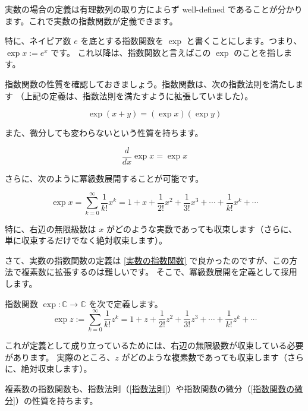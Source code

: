\documentclass[a5paper]{ltjsarticle}
\begin{document}
実数の場合の定義は有理数列の取り方によらず well-defined であることが分かります。これで実数の指数関数が定義できます。

特に、ネイピア数 \(e\) を底とする指数関数を \(\exp \) と書くことにします。つまり、\(\exp x := e^x\) です。
これ以降は、指数関数と言えばこの \(\exp \) のことを指します。

指数関数の性質を確認しておきましょう。指数関数は、次の指数法則を満たします
（上記の定義は、指数法則を満たすように拡張していました）。

\begin{usmproposition}[指数法則]\label{指数法則}
    \[
        \exp(x + y) = (\exp x) (\exp y)
    \]
\end{usmproposition}

また、微分しても変わらないという性質を持ちます。

\begin{usmproposition}[指数関数の微分]\label{指数関数の微分}
    \[
        \frac{d}{dx} \exp x = \exp x
    \]
\end{usmproposition}

さらに、次のように冪級数展開することが可能です。

\begin{usmproposition}[指数関数の冪級数展開]
    \[
        \exp x = \sum_{k=0}^{\infty} \frac{1}{k!} x^k
        = 1 + x + \frac{1}{2!}x^2 + \frac{1}{3!}x^3 + \cdots + \frac{1}{k!}x^k + \cdots
    \]
\end{usmproposition}

特に、右辺の無限級数は \(x\) がどのような実数であっても収束します（さらに、単に収束するだけでなく絶対収束します）。

さて、実数の指数関数の定義は \autoref{実数の指数関数} で良かったのですが、この方法で複素数に拡張するのは難しいです。
そこで、冪級数展開を定義として採用します。

\begin{usmdefinition}[複素数の指数関数]\label{複素数の指数関数}
    指数関数 \(\exp : \mathbb{C} \to \mathbb{C}\) を次で定義します。
    \[
        \exp z := \sum_{k=0}^{\infty} \frac{1}{k!} z^k
        = 1 + z + \frac{1}{2!}z^2 + \frac{1}{3!}z^3 + \cdots + \frac{1}{k!}z^k + \cdots
    \]
\end{usmdefinition}

これが定義として成り立っているためには、右辺の無限級数が収束している必要があります。
実際のところ、\(z\) がどのような複素数であっても収束します（さらに、絶対収束します）。

複素数の指数関数も、指数法則（\autoref{指数法則}）や指数関数の微分（\autoref{指数関数の微分}）の性質を持ちます。
\end{document}
